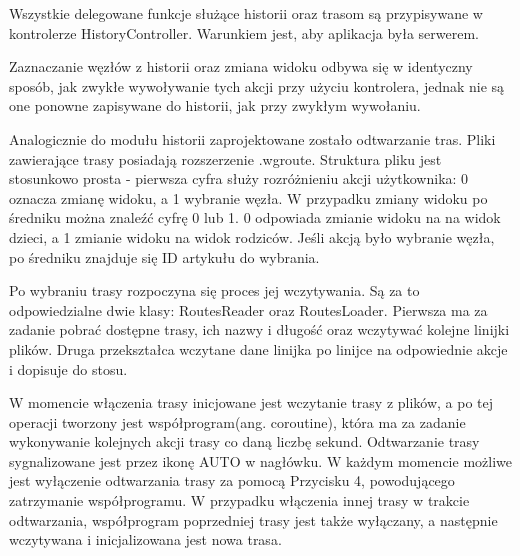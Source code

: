 Wszystkie delegowane funkcje służące historii oraz trasom są przypisywane w kontrolerze HistoryController. Warunkiem jest, aby aplikacja była serwerem.

Zaznaczanie węzłów z historii oraz zmiana widoku odbywa się w identyczny sposób, jak zwykłe wywoływanie tych akcji przy użyciu kontrolera, jednak nie są one ponowne zapisywane do historii, jak przy zwykłym wywołaniu.

Analogicznie do modułu historii zaprojektowane zostało odtwarzanie tras. Pliki zawierające trasy posiadają rozszerzenie .wgroute. Struktura pliku jest stosunkowo prosta - pierwsza cyfra służy rozróżnieniu akcji użytkownika: 0 oznacza zmianę widoku, a 1 wybranie węzła. W przypadku zmiany widoku po średniku można znaleźć cyfrę 0 lub 1. 0 odpowiada zmianie widoku na na widok dzieci, a 1 zmianie widoku na widok rodziców. Jeśli akcją było wybranie węzła, po średniku znajduje się ID artykułu do wybrania. 



Po wybraniu trasy rozpoczyna się proces jej wczytywania. Są za to odpowiedzialne dwie klasy: RoutesReader oraz RoutesLoader. Pierwsza ma za zadanie pobrać dostępne trasy, ich nazwy i długość oraz wczytywać kolejne linijki plików. Druga przekształca wczytane dane linijka po linijce na odpowiednie akcje i dopisuje do stosu.

W momencie włączenia trasy inicjowane jest wczytanie trasy z plików, a po tej operacji tworzony jest współprogram(ang. coroutine), która ma za zadanie wykonywanie kolejnych akcji trasy co daną liczbę sekund. Odtwarzanie trasy sygnalizowane jest przez ikonę AUTO w nagłówku. W każdym momencie możliwe jest wyłączenie odtwarzania trasy za pomocą Przycisku 4, powodującego zatrzymanie współprogramu. W przypadku włączenia innej trasy w trakcie odtwarzania, współprogram poprzedniej trasy jest także wyłączany, a następnie wczytywana i inicjalizowana jest nowa trasa. 
